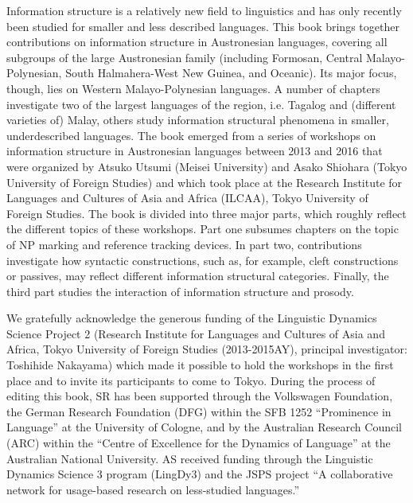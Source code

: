 \noindent
Information structure is a relatively new field to linguistics and has only recently been studied for smaller and less described languages. This book brings together contributions on information structure in Austronesian languages, covering all subgroups of the large Austronesian family (including Formosan, Central Malayo-Polynesian, South Halmahera-West New Guinea, and Oceanic). Its major focus, though, lies on Western Malayo-Polynesian languages. A number of chapters investigate two of the largest languages of the region, i.e. Tagalog and (different varieties of) Malay, others study information structural phenomena in smaller, underdescribed languages. The book emerged from a series of workshops on information structure in Austronesian languages between 2013 and 2016 that were organized by Atsuko Utsumi (Meisei University) and Asako Shiohara (Tokyo University of Foreign Studies) and which took place at the Research Institute for Languages and Cultures of Asia and Africa (ILCAA), Tokyo University of Foreign Studies. The book is divided into three major parts, which roughly reflect the different topics of these workshops. Part one subsumes chapters on the topic of NP marking and reference tracking devices. In part two, contributions investigate how syntactic constructions, such as, for example, cleft constructions or passives, may reflect different information structural categories. Finally, the third part studies the interaction of information structure and prosody.

We gratefully acknowledge the generous funding of the Linguistic Dynamics Science Project 2 (Research Institute for Languages and Cultures of Asia and Africa, Tokyo University of Foreign Studies (2013-2015AY), principal investigator: Toshihide Nakayama) which made it possible to hold the workshops in the first place and to invite its participants to come to Tokyo. During the process of editing this book, SR has been supported through the Volkswagen Foundation, the German Research Foundation (DFG) within the SFB 1252 “Prominence in Language” at the University of Cologne, and by the Australian Research Council (ARC) within the “Centre of Excellence for the Dynamics of Language” at the Australian National University. AS received funding through the Linguistic Dynamics Science 3 program (LingDy3) and the JSPS project “A collaborative network for usage-based research on less-studied languages.”\largerpage[-2]

